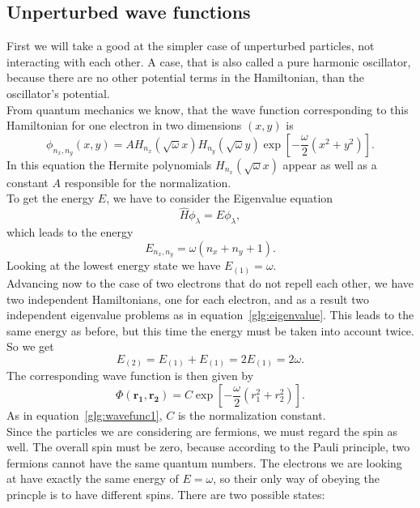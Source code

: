 \subsection{Unperturbed wave functions}\label{sec:unperturbed}
First we will take a good at the simpler case of unperturbed particles, not interacting with each other. A case, that is also called a pure harmonic oscillator, because there are no other potential terms in the Hamiltonian, than the oscillator's potential.\\
From quantum mechanics we know, that the wave function corresponding to this Hamiltonian for one electron in two dimensions $(x,y)$ is
\begin{equation}\label{glg:wavefunc1}
\phi_{n_x,n_y}(x,y) = A H_{n_x} (\sqrt{\omega} x) H_{n_y} (\sqrt{\omega} y) \exp\left[-\frac{\omega}{2} (x^2+y^2)\right].
\end{equation}
In this equation the Hermite polynomials $H_{n_x} (\sqrt{\omega} x)$ appear as well as a constant $A$ responsible for the normalization.\\
To get the energy $E$, we have to consider the Eigenvalue equation
\begin{equation}\label{glg:eigenvalue}
\hat{H} \phi_\lambda = E \phi_\lambda,
\end{equation}
which leads to the energy
\begin{equation}
E_{n_x,n_y} = \omega(n_x + n_y +1).
\end{equation}
Looking at the lowest energy state we have $E_{(1)}=\omega$.\\
Advancing now to the case of two electrons that do not repell each other, we have two independent Hamiltonians, one for each electron, and as a result two independent eigenvalue problems as in equation~\ref{glg:eigenvalue}. This leads to the same energy as before, but this time the energy must be taken into account twice. So we get
\begin{equation}
E_{(2)} = E_{(1)} + E_{(1)} = 2 E_{(1)} = 2\omega.
\end{equation}
The corresponding wave function is then given by
\begin{equation}
\Phi(\mathbf{r_1},\mathbf{r_2}) = C \exp\left[-\frac{\omega}{2} (r_1^2+r_2^2)\right].
\end{equation}
As in equation~\ref{glg:wavefunc1}, $C$ is the normalization constant.\\
Since the particles we are considering are fermions, we must regard the spin as well. The overall spin must be zero, because according to the Pauli principle, two fermions cannot have the same quantum numbers. The electrons we are looking at have exactly the same energy of $E = \omega$, so their only way of obeying the princple is to have different spins. There are two possible states:
